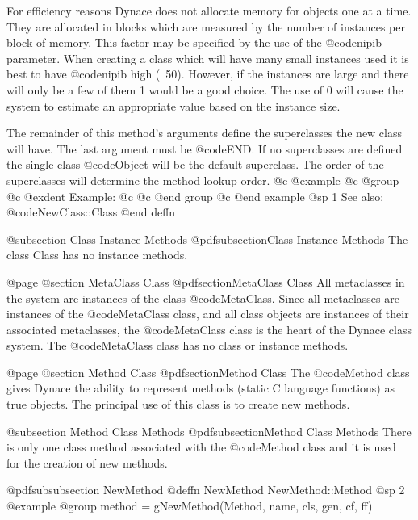 For efficiency reasons Dynace does not allocate memory for objects
one at a time.  They are allocated in blocks which are measured
by the number of instances per block of memory.  This factor
may be specified by the use of the @code{nipib} parameter.  When
creating a class which will have many small instances used it
is best to have @code{nipib} high (~50).  However, if the instances
are large and there will only be a few of them 1 would be a good choice.
The use of 0 will cause the system to estimate an appropriate value
based on the instance size.

The remainder of this method's arguments define the superclasses the new
class will have.  The last argument must be @code{END}.  If no superclasses
are defined the single class @code{Object} will be the default
superclass.  The order of the superclasses will determine the method
lookup order.
@c @example
@c @group
@c @exdent Example:
@c 
@c @end group
@c @end example
@sp 1
See also:  @code{NewClass::Class}
@end deffn




@subsection Class Instance Methods
@pdfsubsection{Class Instance Methods}
The class Class has no instance methods.


@page
@section MetaClass Class
@pdfsection{MetaClass Class}
All metaclasses in the system are instances of the class @code{MetaClass}.
Since all metaclasses are instances of the @code{MetaClass} class, and
all class objects are instances of their associated metaclasses, the
@code{MetaClass} class is the heart of the Dynace class system.  The
@code{MetaClass} class has no class or instance methods.



@page
@section Method Class
@pdfsection{Method Class}
The @code{Method} class gives Dynace the ability to represent methods
(static C language functions) as true objects.  The principal use of this
class is to create new methods.


@subsection Method Class Methods
@pdfsubsection{Method Class Methods}
There is only one class method associated with the @code{Method} class and
it is used for the creation of new methods.




@pdfsubsubsection {NewMethod}
@deffn {NewMethod} NewMethod::Method
@sp 2
@example
@group
method = gNewMethod(Method, name, cls, gen, cf, ff)

